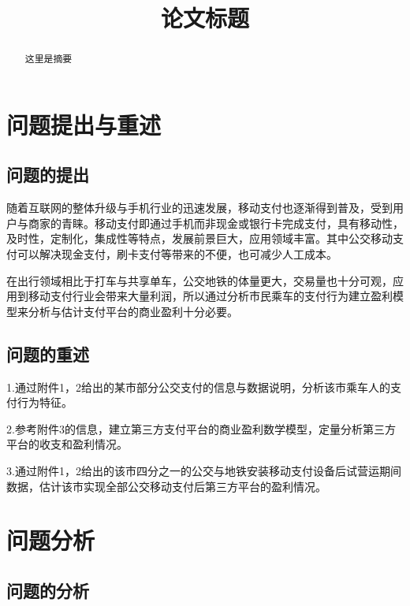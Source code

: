 \documentclass[withoutpreface,bwprint]{cumcmthesis} %
\title{论文标题}
\begin{document}
 \maketitle
 \begin{abstract}

这里是摘要

\end{abstract}

\tableofcontents

\section{问题提出与重述}

\subsection{问题的提出}

随着互联网的整体升级与手机行业的迅速发展，移动支付也逐渐得到普及，受到用户与商家的青睐。移动支付即通过手机而非现金或银行卡完成支付，具有移动性，及时性，定制化，集成性等特点，发展前景巨大，应用领域丰富。其中公交移动支付可以解决现金支付，刷卡支付等带来的不便，也可减少人工成本。

在出行领域相比于打车与共享单车，公交地铁的体量更大，交易量也十分可观，应用到移动支付行业会带来大量利润，所以通过分析市民乘车的支付行为建立盈利模型来分析与估计支付平台的商业盈利十分必要。



\subsection{问题的重述}

1.通过附件1，2给出的某市部分公交支付的信息与数据说明，分析该市乘车人的支付行为特征。

2.参考附件3的信息，建立第三方支付平台的商业盈利数学模型，定量分析第三方平台的收支和盈利情况。

3.通过附件1，2给出的该市四分之一的公交与地铁安装移动支付设备后试营运期间数据，估计该市实现全部公交移动支付后第三方平台的盈利情况。

\section{问题分析}

\subsection{问题的分析}
\end{document}
